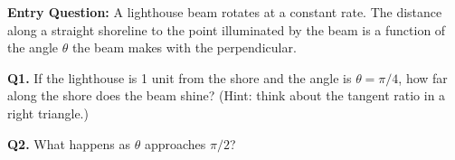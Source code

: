 \documentclass[10pt]{article}
\begin{document}
\vspace{0.06in}

\begin{hookbox}
\textbf{Entry Question:} A lighthouse beam rotates at a constant rate.  The distance
along a straight shoreline to the point illuminated by the beam is a function of the
angle $\theta$ the beam makes with the perpendicular.

\vspace{4pt}
\textbf{Q1.} If the lighthouse is 1 unit from the shore and the angle is $\theta=\pi/4$,
how far along the shore does the beam shine?  (Hint: think about the tangent ratio in a
right triangle.)


\textbf{Q2.} What happens as $\theta$ approaches $\pi/2$?


\vspace{4pt}
\begin{center}
\end{center}

\end{hookbox}

\vspace{0.06in}
\end{document}
